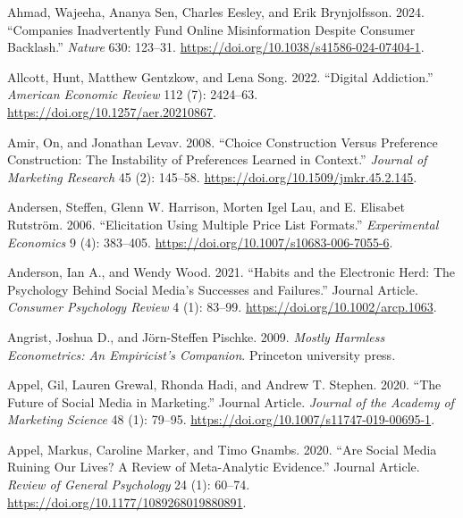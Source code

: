 \documentclass[
  a4paper,
]{scrreprt}
\newlength{\cslhangindent}
\newlength{\cslentryspacingunit} %
\newenvironment{CSLReferences}[2] %
 {%
  \setlength{\parindent}{0pt}
  \ifodd #1
  \let\oldpar\par
  \def\par{\hangindent=\cslhangindent\oldpar}
  \fi
  \setlength{\parskip}{#2\cslentryspacingunit}
 }%
 {}
\begin{document}
\hypertarget{refs}{}
\begin{CSLReferences}{1}{0}
\leavevmode{}%
Ahmad, Wajeeha, Ananya Sen, Charles Eesley, and Erik Brynjolfsson. 2024.
{``Companies Inadvertently Fund Online Misinformation Despite Consumer
Backlash.''} \emph{Nature} 630: 123--31.
\url{https://doi.org/10.1038/s41586-024-07404-1}.

\leavevmode{}%
Allcott, Hunt, Matthew Gentzkow, and Lena Song. 2022. {``Digital
Addiction.''} \emph{American Economic Review} 112 (7): 2424--63.
\url{https://doi.org/10.1257/aer.20210867}.

\leavevmode{}%
Amir, On, and Jonathan Levav. 2008. {``Choice Construction Versus
Preference Construction: The Instability of Preferences Learned in
Context.''} \emph{Journal of Marketing Research} 45 (2): 145--58.
\url{https://doi.org/10.1509/jmkr.45.2.145}.

\leavevmode{}%
Andersen, Steffen, Glenn W. Harrison, Morten Igel Lau, and E. Elisabet
Rutström. 2006. {``Elicitation Using Multiple Price List Formats.''}
\emph{Experimental Economics} 9 (4): 383--405.
\url{https://doi.org/10.1007/s10683-006-7055-6}.

\leavevmode{}%
Anderson, Ian A., and Wendy Wood. 2021. {``Habits and the Electronic
Herd: The Psychology Behind Social Media's Successes and Failures.''}
Journal Article. \emph{Consumer Psychology Review} 4 (1): 83--99.
\url{https://doi.org/10.1002/arcp.1063}.

\leavevmode{}%
Angrist, Joshua D., and Jörn-Steffen Pischke. 2009. \emph{Mostly
Harmless Econometrics: An Empiricist's Companion}. Princeton university
press.

\leavevmode{}%
Appel, Gil, Lauren Grewal, Rhonda Hadi, and Andrew T. Stephen. 2020.
{``The Future of Social Media in Marketing.''} Journal Article.
\emph{Journal of the Academy of Marketing Science} 48 (1): 79--95.
\url{https://doi.org/10.1007/s11747-019-00695-1}.

\leavevmode{}%
Appel, Markus, Caroline Marker, and Timo Gnambs. 2020. {``Are Social
Media Ruining Our Lives? A Review of Meta-Analytic Evidence.''} Journal
Article. \emph{Review of General Psychology} 24 (1): 60--74.
\url{https://doi.org/10.1177/1089268019880891}.


\end{CSLReferences}
\end{document}
